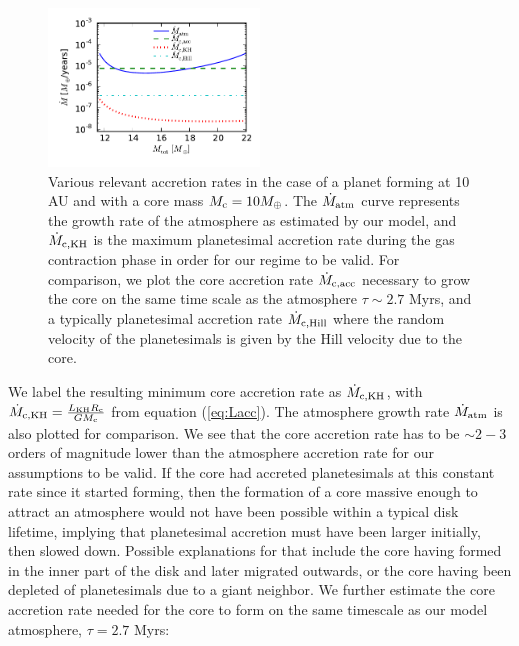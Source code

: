 \documentclass[apj]{emulateapj}
\newcommand{\co}{_{\rm c}}
\begin{document}
 \begin{figure}[h]
\centering
\includegraphics[width=0.5\textwidth]{../../figs/ModelAtmospheres/RadSelfGravRealEOS/PaperFigs/acc_rates_paper.pdf}
\caption{Various relevant accretion rates in the case of a planet forming at 10 AU and with a core mass $M\co=10 M_{\oplus}$. The $\dot{M}_{\rm{atm}}$ curve represents the growth rate of the atmosphere as estimated by our model, and $\dot{M}_{\rm{c,KH}}$ is the maximum planetesimal accretion rate during the gas contraction phase in order for our regime to be valid. For comparison, we plot the core accretion rate $\dot{M}_{\rm{c,acc}}$ necessary to grow the core on the same time scale as the atmosphere $\tau \sim 2.7$ Myrs, and a typically planetesimal accretion rate $\dot{M}_{\rm{c,Hill}}$ where the random velocity of the planetesimals is given by the Hill velocity due to the core.}
\label{fig:accrates}
\end{figure}

We label the resulting minimum core accretion rate as $\dot{M}_{\rm{c,KH}}$, with  $\dot{M}_{\rm{c,KH}}=\frac{L_{\rm{KH}} R\co}{G M\co}$ from equation (\ref{eq:Lacc}). The atmosphere growth rate $\dot{M}_{\rm{atm}}$ is also plotted for comparison. We see that the core accretion rate has to be $\sim2-3$ orders of magnitude lower than the atmosphere accretion rate for our assumptions to be valid.  If the core had accreted planetesimals at this constant rate since it started forming, then the formation of a core massive enough to attract an atmosphere would not have been possible within a typical disk lifetime, implying that planetesimal accretion must have been larger initially, then slowed down. Possible explanations for that include the core having formed in the inner part of the disk and later migrated outwards, or the core having been depleted of planetesimals due to a giant neighbor. We further estimate the core accretion rate needed for the core to form on the same timescale as our model atmosphere, $\tau=2.7$ Myrs:
\end{document}
